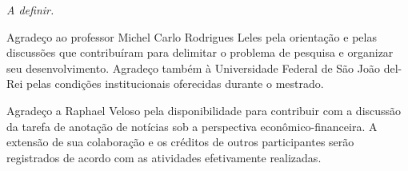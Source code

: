 \begin{folhadeaprovacao}

  \begin{center}
    {\ABNTEXchapterfont\large\imprimirautor}

    \vspace*{\fill}\vspace*{\fill}
    {\ABNTEXchapterfont\bfseries\Large\imprimirtitulo}
    \vspace*{\fill}

    \hspace{.45\textwidth}
    \begin{minipage}{.5\textwidth}
        \imprimirpreambulo
    \end{minipage}%
    \vspace*{\fill}
   \end{center}

   \textit{A definir.}


   \begin{center}
    \vspace*{0.5cm}
    {\large\imprimirlocal}
    \par
    {\large\imprimirdata}
    \vspace*{1cm}
  \end{center}

\end{folhadeaprovacao}

\begin{agradecimentos}
Agradeço ao professor Michel Carlo Rodrigues Leles pela orientação e pelas discussões que contribuíram para delimitar o problema de pesquisa e organizar seu desenvolvimento. Agradeço também à Universidade Federal de São João del-Rei pelas condições institucionais oferecidas durante o mestrado.

Agradeço a Raphael Veloso pela disponibilidade para contribuir com a discussão da tarefa de anotação de notícias sob a perspectiva econômico-financeira. A extensão de sua colaboração e os créditos de outros participantes serão registrados de acordo com as atividades efetivamente realizadas.
\end{agradecimentos}

